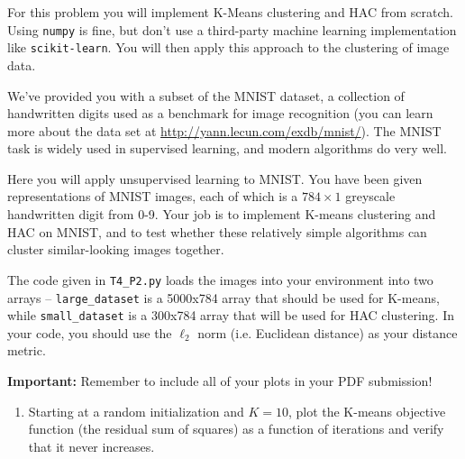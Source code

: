 \documentclass[submit]{harvardml}
\begin{document}



\begin{problem}


For this problem you will implement K-Means clustering and HAC from
scratch. Using \texttt{numpy} is fine, but don't use a third-party
machine learning implementation like \texttt{scikit-learn}. You will
then apply this approach to the clustering of image data.

We've provided you with a subset of the MNIST dataset, a collection of
handwritten digits used as a benchmark for image recognition (you can
learn more about the data set at
\url{http://yann.lecun.com/exdb/mnist/}). The MNIST task is widely
used in supervised learning, and modern algorithms do very well.

Here you will apply unsupervised learning to MNIST. You have been given
representations of MNIST images, each of which is a $784\times1$
greyscale handwritten digit from 0-9. Your job is to implement K-means
clustering and HAC on MNIST, and to test whether these relatively
simple algorithms can cluster similar-looking images together.

The code given in \texttt{T4\_P2.py} loads the images into your environment into two arrays -- \texttt{large\_dataset} is a 5000x784 array that should be used for K-means, while \texttt{small\_dataset} is a 300x784 array that will be used for HAC clustering. In your code, you should use the $\ell_2$ norm (i.e. Euclidean distance) as your distance metric.

\textbf{Important:} Remember to include all of your plots in your PDF submission!

\begin{enumerate}

\item Starting at a random initialization and $K = 10$, plot
  the K-means objective function (the residual sum of squares) as a function of iterations and verify
  that it never increases.


\end{enumerate}
\end{problem}
\end{document}
